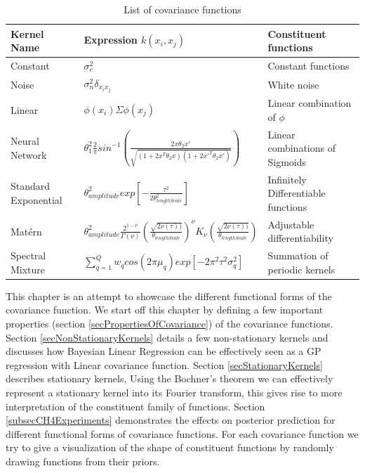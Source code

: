 \begin{table}[!h]
    \centering
\begin{tabularx}{\textwidth}{|l|l|X|}
  \hline
Kernel Name  & Expression $k(x_{i}, x_{j})$ & Constituent functions \\
  \hline 
  \hline
Constant & \small $\sigma_{c}^2$ & Constant functions \normalsize\\
Noise & \small $\sigma_{n}^2\delta_{x_{i}x_{j}}$ & White noise \normalsize\\
Linear & \small $\phi(x_{i})\Sigma\phi(x_{j})$ & Linear combination of $\phi$ \normalsize\\
Neural Network & \small $\theta_{1}^{2}\frac{2}{\pi} sin^{-1}\left ( \frac{2x\theta_{2}x'}{\sqrt{(1+2x^{T}\theta_{2}x)(1+2x'^{T}\theta_{2}x')}} \right )$ & Linear combinations of Sigmoids \normalsize\\
Standard Exponential & \small $\theta_{amplitude}^2exp[-\frac{\tau^2}{2\theta_{lengthScale}^2}]$ & Infinitely Differentiable functions \normalsize\\ 
Mat\'ern & \small $\theta_{amplitude}^2\frac{2^{1- \nu }}{\Gamma (\nu)}\left ( \frac{\sqrt{2\nu(\tau))}}{\theta_{lengthScale}} \right )^{\nu}K_{\nu}\left ( \frac{\sqrt{2\nu(\tau))}}{\theta_{lengthScale}} \right)$ & Adjustable differentiability \normalsize\\
Spectral Mixture & \small  $\sum_{q=1}^{Q}w_{q}cos(2\pi\mu_{q}) exp[-2\pi^{2}\tau^{2}\sigma_{q}^2]$ & Summation of periodic kernels \normalsize\\
   \hline
\end{tabularx}
  \label{tabListOfCovarianceFUnctions}
  \caption{List of covariance functions}
  \end{table}
  
This chapter is an attempt to showcase the different functional forms of the covariance function. We start off this chapter by defining a few important properties (section \ref{secPropertiesOfCovariance}) of the covariance functions. Section \ref{secNonStationaryKernels} details a few non-stationary kernels and discusses how Bayesian Linear Regression can be effectively seen as a GP regression with Linear covariance function. Section \ref{secStationaryKernels} describes stationary kernels, Using the Bochner's theorem we can effectively represent a stationary kernel into its Fourier transform, this gives rise to more interpretation of the constituent family of functions. Section \ref{subsecCH4Experiments} demonstrates the effects on posterior prediction for different functional forms of covariance functions. For each covariance function we try to give a visualization of the shape of constituent functions by randomly drawing functions from their priors. 

